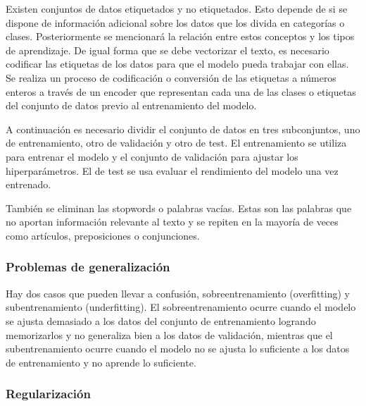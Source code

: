 Existen conjuntos de datos etiquetados y no etiquetados. Esto depende de si se dispone de información adicional sobre los datos que los divida en categorías o clases.
Posteriormente se mencionará la relación entre estos conceptos y los tipos de aprendizaje.
De igual forma que se debe vectorizar el texto, es necesario codificar las etiquetas de los datos para que el modelo pueda trabajar con ellas.
Se realiza un proceso de codificación o conversión de las etiquetas a números enteros a través de un encoder que representan cada una de las clases o etiquetas del conjunto de datos previo al entrenamiento del modelo.

A continuación es necesario dividir el conjunto de datos en tres subconjuntos, uno de entrenamiento, otro de validación y otro de test.
El entrenamiento se utiliza para entrenar el modelo y el conjunto de validación para ajustar los hiperparámetros. El de test se usa evaluar el rendimiento del modelo una vez entrenado.

También se eliminan las stopwords o palabras vacías. Estas son las palabras que no aportan información relevante al texto y se repiten en la mayoría de veces como artículos, preposiciones o conjunciones.

\subsubsection{Problemas de generalización}

Hay dos casos que pueden llevar a confusión, sobreentrenamiento (overfitting) y subentrenamiento (underfitting).
El sobreentrenamiento ocurre cuando el modelo se ajusta demasiado a los datos del conjunto de entrenamiento logrando memorizarlos y no generaliza bien a los datos de validación, mientras que el subentrenamiento ocurre cuando el modelo no se ajusta lo suficiente a los datos de entrenamiento y no aprende lo suficiente.

\subsubsection{Regularización}

